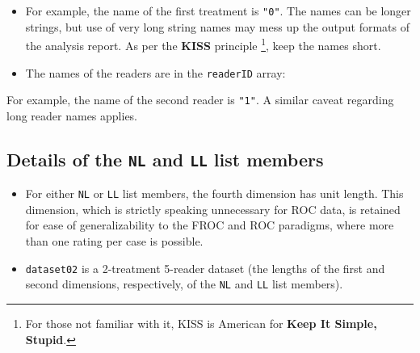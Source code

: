 \documentclass[]{book}
\newenvironment{Shaded}{\begin{snugshade}}{\end{snugshade}}
\newcommand{\CommentTok}[1]{\textcolor[rgb]{0.56,0.35,0.01}{\textit{#1}}}
\newcommand{\KeywordTok}[1]{\textcolor[rgb]{0.13,0.29,0.53}{\textbf{#1}}}
\newcommand{\NormalTok}[1]{#1}
\newcommand{\OperatorTok}[1]{\textcolor[rgb]{0.81,0.36,0.00}{\textbf{#1}}}
\providecommand{\tightlist}{%
  \setlength{\itemsep}{0pt}\setlength{\parskip}{0pt}}
\let\rmarkdownfootnote\footnote%
\def\footnote{\protect\rmarkdownfootnote}
\begin{document}
\begin{Shaded}
\end{Shaded}

\begin{itemize}
\tightlist
\item
  For example, the name of the first treatment is \texttt{"0"}. The names can be longer strings, but use of very long string names may mess up the output formats of the analysis report. As per the \textbf{KISS} principle \footnote{For those not familiar with it, KISS is American for \textbf{Keep It Simple, Stupid}.}, keep the names short.
\item
  The names of the readers are in the \texttt{readerID} array:
\end{itemize}

\begin{Shaded}
\end{Shaded}

For example, the name of the second reader is \texttt{"1"}. A similar caveat regarding long reader names applies.

\hypertarget{details-of-the-nl-and-ll-list-members}{%
\subsection{\texorpdfstring{Details of the \texttt{NL} and \texttt{LL} list members}{Details of the NL and LL list members}}\label{details-of-the-nl-and-ll-list-members}}

\begin{itemize}
\tightlist
\item
  For either \texttt{NL} or \texttt{LL} list members, the fourth dimension has unit length. This dimension, which is strictly speaking unnecessary for ROC data, is retained for ease of generalizability to the FROC and ROC paradigms, where more than one rating per case is possible.
\item
  \texttt{dataset02} is a 2-treatment 5-reader dataset (the lengths of the first and second dimensions, respectively, of the \texttt{NL} and \texttt{LL} list members).
\end{itemize}
\end{document}
